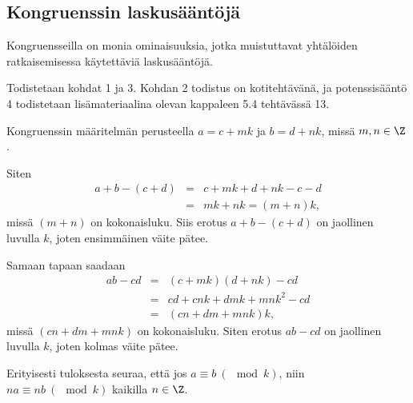 \subsection*{Kongruenssin laskusääntöjä} Kongruensseilla on monia ominaisuuksia, jotka muistuttavat yhtälöiden ratkaisemisessa käytettäviä laskusääntöjä.


\begin{todistus}
Todistetaan kohdat 1 ja 3. Kohdan 2 todistus on kotitehtävänä, ja potenssisääntö 4 todistetaan lisämateriaalina olevan kappaleen 5.4 tehtävässä 13.

Kongruenssin määritelmän perusteella $a=c + mk$ ja $b= d + nk$, missä $m, n\in \Z$.

Siten
\begin{eqnarray*}
a+b - (c+d) &=& c + mk + d + nk - c - d\\ &=& mk + nk = (m+n)k,
\end{eqnarray*}
missä $(m+n)$ on kokonaisluku. Siis erotus $a + b - (c+d)$ on jaollinen luvulla $k$, joten ensimmäinen väite pätee.

Samaan tapaan saadaan
\begin{eqnarray*}
ab - cd &=& (c + mk)(d + nk) - cd\\ &=& cd +c nk + d mk + mnk^2 - cd\\ &=& (cn+dm+mnk)k,
\end{eqnarray*}
missä $(cn+dm+mnk)$ on kokonaisluku. Siten erotus $ab - cd$ on jaollinen luvulla $k$, joten kolmas väite pätee.
\end{todistus}


Erityisesti tuloksesta seuraa, että  jos $a\equiv b \ (\mod k)$, niin $na\equiv nb
\ (\mod k)$ kaikilla $n\in \Z$.



